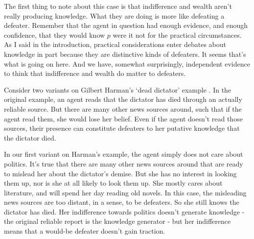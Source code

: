 The first thing to note about this case is that indifference and wealth aren't really producing knowledge. What they are doing is more like defeating a defeater. Remember that the agent in question had enough evidence, and enough confidence, that they would know $p$ were it not for the practical circumstances. As I said in the introduction, practical considerations enter debates about knowledge in part because they are distinctive kinds of defeaters. It seems that's what is going on here. And we have, somewhat surprisingly, independent evidence to think that indifference and wealth do matter to defeaters.

Consider two variants on Gilbert Harman's `dead dictator' example \citep[75]{Harman1973}. In the original example, an agent reads that the dictator has died through an actually reliable source. But there are many other news sources around, such that if the agent read them, she would lose her belief. Even if the agent doesn't read those sources, their presence can constitute defeaters to her putative knowledge that the dictator died.

In our first variant on Harman's example, the agent simply does not care about politics. It's true that there are many other news sources around that are ready to mislead her about the dictator's demise. But she has no interest in looking them up, nor is she at all likely to look them up. She mostly cares about literature, and will spend her day reading old novels. In this case, the misleading news sources are too distant, in a sense, to be defeaters. So she still knows the dictator has died. Her indifference towards politics doesn't generate knowledge - the original reliable report is the knowledge generator - but her indifference means that a would-be defeater doesn't gain traction.

